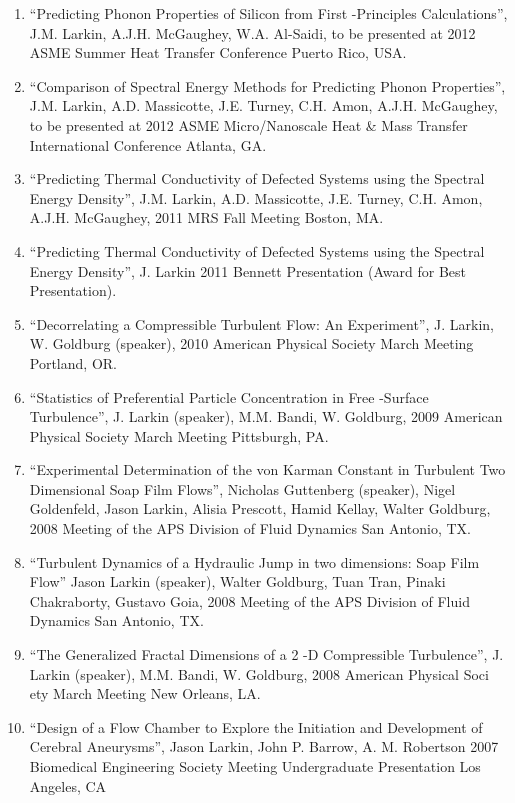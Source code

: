 \documentclass[letterpaper,12pt]{article}
\begin{document}
\begin{enumerate}


\item “Predicting Phonon Properties of Silicon from First -Principles Calculations”, J.M. Larkin, A.J.H.
McGaughey, W.A. Al-Saidi, to be presented at 2012 ASME Summer Heat Transfer Conference Puerto
Rico, USA.

\item “Comparison of Spectral Energy Methods for Predicting Phonon Properties”, J.M. Larkin, A.D.
Massicotte, J.E. Turney, C.H. Amon, A.J.H. McGaughey, to be presented at 2012 ASME
Micro/Nanoscale Heat \& Mass Transfer International Conference Atlanta, GA.

\item “Predicting Thermal Conductivity of Defected Systems using the Spectral Energy Density”, J.M. Larkin, A.D.
Massicotte, J.E. Turney, C.H. Amon, A.J.H. McGaughey, 2011 MRS Fall Meeting Boston, MA.

\item “Predicting Thermal Conductivity of Defected Systems using the Spectral Energy Density”, J. Larkin
2011 Bennett Presentation (Award for Best Presentation).

\item “Decorrelating a Compressible Turbulent Flow: An Experiment”, J. Larkin, W. Goldburg (speaker),
2010 American Physical Society March Meeting Portland, OR.

\item “Statistics of Preferential Particle Concentration in Free -Surface Turbulence”, J. Larkin (speaker),
M.M. Bandi, W. Goldburg, 2009 American Physical Society March Meeting Pittsburgh, PA.

\item “Experimental Determination of the von Karman Constant in Turbulent Two Dimensional Soap Film
Flows”, Nicholas Guttenberg (speaker), Nigel Goldenfeld, Jason Larkin, Alisia Prescott, Hamid Kellay,
Walter Goldburg, 2008 Meeting of the APS Division of Fluid Dynamics San Antonio, TX.

\item “Turbulent Dynamics of a Hydraulic Jump in two dimensions: Soap Film Flow” Jason Larkin (speaker),
Walter Goldburg, Tuan Tran, Pinaki Chakraborty, Gustavo Goia, 2008 Meeting of the APS Division of
Fluid Dynamics San Antonio, TX.

\item “The Generalized Fractal Dimensions of a 2 -D Compressible Turbulence”, J. Larkin (speaker), M.M.
Bandi, W. Goldburg, 2008 American Physical Soci ety March Meeting New Orleans, LA.

\item “Design of a Flow Chamber to Explore the Initiation and Development of Cerebral Aneurysms”,
Jason Larkin, John P. Barrow, A. M. Robertson 2007 Biomedical Engineering Society Meeting
Undergraduate Presentation Los Angeles, CA


\end{enumerate}
\end{document}
